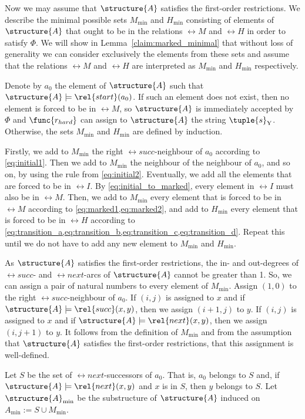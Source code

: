 \documentclass{lmcs}
\begin{document}
Now we may assume that $\structure{A}$ satisfies the first-order restrictions.
We describe the minimal possible sets $M_{\min}$ and $H_{\min}$ consisting of elements of $\structure{A}$ that ought to be in the relations $\rel{M}$ and $\rel{H}$ in order to satisfy $\Phi$.
We will show in Lemma~\ref{claim:marked_minimal} that without loss of generality we can consider exclusively the elements from these sets and  assume that the relations $\rel{M}$ and $\rel{H}$ are interpreted as $M_{\min}$ and $H_{\min}$ respectively.

Denote by $a_0$ the element of $\structure{A}$ such that $\structure{A}\models\rel{start}(a_0)$.
If such an element does not exist, then no element is forced to be in $\rel{M}$, so $\structure{A}$ is immediately accepted by $\Phi$ and $\func{r_{hard}}$ can assign to $\structure{A}$ the string $\tuple{s}_\mathrm{Y}$.
Otherwise, the sets $M_{\min}$ and $H_{\min}$ are defined by induction.

Firstly, we add to $M_{\min}$ the right $\rel{succ}$-neighbour of $a_0$ according to \cref{eq:initial1}. 
Then we add to $M_{\min}$ the neighbour of the neighbour of $a_0$, and so on, by using the rule from \cref{eq:initial2}.
Eventually, we add all the elements that are forced to be in $\rel{I}$.
By \cref{eq:initial_to_marked}, every element in $\rel{I}$ must also be in $\rel{M}$.
Then, we add to $M_{\min}$ every element that is forced to be in $\rel{M}$ according to \cref{eq:marked1,eq:marked2}, and add to $H_{\min}$ every element that is forced to be in $\rel{H}$ according to \cref{eq:transition_a,eq:transition_b,eq:transition_c,eq:transition_d}.
Repeat this until we do not have to add any new element to $M_{\min}$ and $H_{\min}$.

As $\structure{A}$ satisfies the first-order restrictions, the in- and out-degrees of $\rel{succ}$- and $\rel{next}$-arcs of $\structure{A}$ cannot be greater than 1.
So, we can assign a pair of natural numbers to every element of $M_{\min}$.
Assign $(1,0)$ to the right $\rel{succ}$-neighbour of $a_0$.
If $(i,j)$ is assigned to $x$ and if $\structure{A}\models\rel{succ}(x,y)$, then we assign $(i+1,j)$ to $y$.
If $(i,j)$ is assigned to $x$ and if $\structure{A}\models\rel{next}(x,y)$, then we assign $(i,j+1)$ to $y$.
It follows from the definition of $M_{\min}$ and from the assumption that $\structure{A}$ satisfies the first-order restrictions, that this assignment is well-defined.


Let $S$ be the set of $\rel{next}$-successors of $a_0$.
That is, $a_0$ belongs to $S$ and, if $\structure{A}\models\rel{next}(x,y)$ and $x$ is in $S$, then $y$ belongs to $S$.
Let $\structure{A}_{\min}$ be the substructure of $\structure{A}$ induced on $A_{\min}:=S\cup M_{\min}$.
\end{document}
